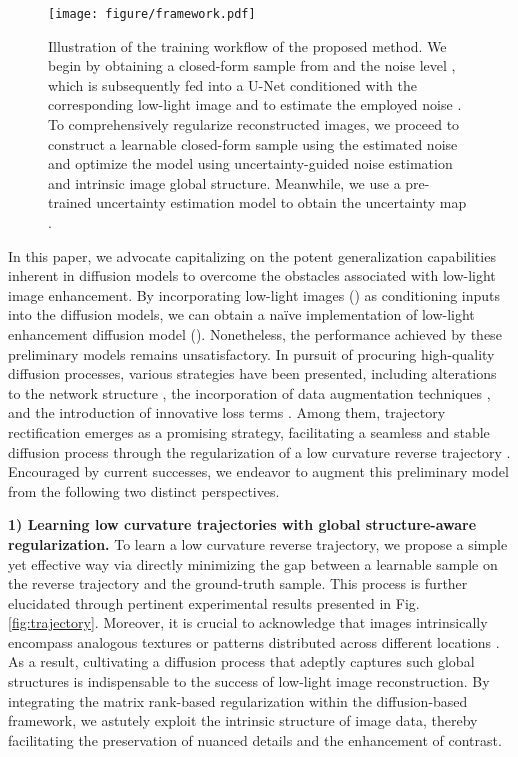 \documentclass{article}
\begin{document}
\begin{figure}[!t]
\centering
\texttt{[image: figure/framework.pdf]}
\vspace{-0.1cm}
\caption{Illustration of the training workflow of the proposed method. We begin by obtaining a closed-form sample  from  and the noise level , which is subsequently fed into a U-Net  conditioned with the corresponding low-light image  and  to estimate the employed noise . To comprehensively regularize reconstructed images, we proceed to construct a learnable closed-form sample  using the estimated noise  and optimize the model using uncertainty-guided noise estimation and intrinsic image global structure. Meanwhile, we use a pre-trained uncertainty estimation model  to obtain the uncertainty map .}
\label{fig:framework}
\vspace{-0.5cm}
\end{figure}

In this paper, we advocate capitalizing on the potent generalization capabilities inherent in diffusion models to overcome the obstacles associated with low-light image enhancement. By incorporating low-light images () as conditioning inputs into the diffusion models, we can obtain a na\"ive implementation of low-light enhancement diffusion model (). Nonetheless, the performance achieved by these preliminary models remains unsatisfactory. In pursuit of procuring high-quality diffusion processes, various strategies have been presented, including alterations to the network structure \cite{ryu2022pyramidal}, the incorporation of data augmentation techniques \cite{trabucco2023effective}, and the introduction of innovative loss terms \cite{muller2023diffrf}. Among them, trajectory rectification emerges as a promising strategy, facilitating a seamless and stable diffusion process through the regularization of a low curvature reverse trajectory \cite{lee2023minimizing, liu2023flow}. Encouraged by current successes, we endeavor to augment this preliminary model from the following two distinct perspectives.

\textbf{1) Learning low curvature trajectories with global structure-aware regularization.}
To learn a low curvature reverse trajectory, we propose a simple yet effective way via directly minimizing the gap between a learnable sample on the reverse trajectory and the ground-truth sample.
This process is further elucidated through pertinent experimental results presented in Fig. \ref{fig:trajectory}.
Moreover, it is crucial to acknowledge that images intrinsically encompass analogous textures or patterns distributed across different locations \cite{buades2005non,peyre2008non,dong2012nonlocally,gu2014weighted,xu2015patch,liu2018non,zha2021image}. As a result, cultivating a diffusion process that adeptly captures such global structures is indispensable to the success of low-light image reconstruction. By integrating the matrix rank-based regularization within the diffusion-based framework, we astutely exploit the intrinsic structure of image data, thereby facilitating the preservation of nuanced details and the enhancement of contrast.
\end{document}
